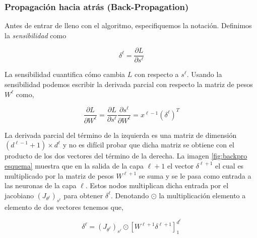        
    \subsubsection{Propagación hacia atrás (Back-Propagation)}
        
        
        Antes de entrar de lleno con el algoritmo, especifiquemos la notación. Definimos la \textit{sensibilidad} como
        
        \begin{equation}\label{eq:sensibity}
            \delta^{\ell} = \frac{\partial L}{\partial s^{\ell}}
        \end{equation}
        
        \noindent La sensibilidad cuantifica cómo cambia $L$ con respecto a $s^{\ell}$. Usando la sensibilidad podemos escribir la derivada parcial con respecto la matriz de pesos $W^{\ell}$ como,
        
        \begin{equation}\label{eq:partial L partial W}
            \frac{\partial L}{\partial W^{\ell}} = \frac{\partial L}{\partial s^{\ell}} \frac{\partial s^{\ell}}{\partial W^{\ell}} = x^{\ell - 1}(\delta^{\ell})^T
        \end{equation}
        
        

        
        
        \noindent La derivada parcial del término de la izquierda es una matriz de dimensión ${(d^{\ell -1} + 1)\times d^{\ell}}$ y no es difícil probar que dicha matriz se obtiene con el producto de los dos vectores del término de la derecha. La imagen \ref{fig:backpro esquema} muestra que en la salida de la capa $\ell + 1$ el vector $\delta^{\ell + 1}$ el cual es multiplicado por la matriz de pesos $W^{\ell + 1}$ se suma y se le pasa como entrada a las neuronas de la capa $\ell$. Estos nodos multiplican dicha entrada por el jacobiano $(J_{\theta^{\ell}})_{s^{\ell}}$ para obtener $\delta^{\ell}$. Denotando $\odot$ la multiplicación elemento a elemento de dos vectores tenemos que,
        
        \begin{equation}
            \delta^{\ell} = (J_{\theta^{\ell}})_{s^{\ell}} \odot [W^{\ell + 1} \delta^{\ell + 1}]_1^{d^{\ell}}
        \end{equation}
        
